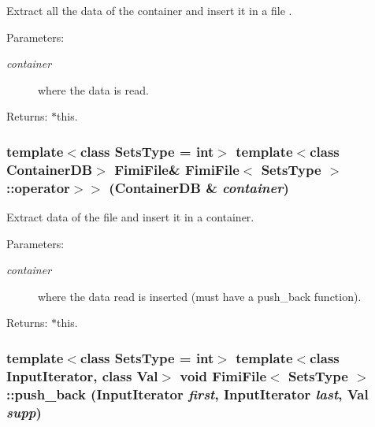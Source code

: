 Extract all the data of the container and insert it in a file . 

\begin{Desc}
\item[Parameters:]
\begin{description}
\item[{\em container}]where the data is read. \end{description}
\end{Desc}
\begin{Desc}
\item[Returns:]$\ast$this. \end{Desc}
\subsubsection{\setlength{\rightskip}{0pt plus 5cm}template$<$class Sets\-Type = int$>$ template$<$class Container\-DB$>$ {\bf Fimi\-File}\& {\bf Fimi\-File}$<$ Sets\-Type $>$::operator$>$$>$ (Container\-DB \& {\em container})\hspace{0.3cm}{\tt  [inline]}}\label{class_fimi_file_3d7feafbe9c9e71df3fda3e9514ebdef}


Extract data of the file and insert it in a container. 

\begin{Desc}
\item[Parameters:]
\begin{description}
\item[{\em container}]where the data read is inserted (must have a push\_\-back function). \end{description}
\end{Desc}
\begin{Desc}
\item[Returns:]$\ast$this. \end{Desc}
\subsubsection{\setlength{\rightskip}{0pt plus 5cm}template$<$class Sets\-Type = int$>$ template$<$class Input\-Iterator, class Val$>$ void {\bf Fimi\-File}$<$ Sets\-Type $>$::push\_\-back (Input\-Iterator {\em first}, Input\-Iterator {\em last}, Val {\em supp})\hspace{0.3cm}{\tt  [inline]}}\label{class_fimi_file_c01fb0d5fcf07c991fe85ca12ecd7a02}


